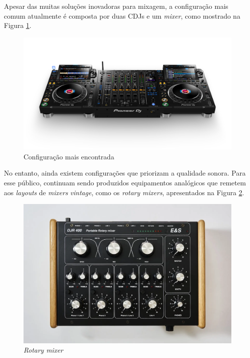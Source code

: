 Apesar das muitas soluções inovadoras para mixagem, a configuração mais comum atualmente é composta por duas CDJs e um \textit{mixer}, como mostrado na Figura \ref{fig17}.

\begin{figure}[h]
	\centering
    \includegraphics[scale=0.3]{figuras/fig17.png}
	\caption{Configuração mais encontrada \cite{pioneerdjDJMA94channel}}
	\label{fig17}
\end{figure}

No entanto, ainda existem configurações que priorizam a qualidade sonora. Para esse público, continuam sendo produzidos equipamentos analógicos que remetem aos \textit{layouts} de \textit{mixers} \textit{vintage}, como os \textit{rotary mixers}, apresentados na Figura \ref{fig18}.

\begin{figure}[h]
	\centering
    \includegraphics[scale=0.2]{figuras/fig18.png}
	\caption{\textit{Rotary mixer} \cite{electroniquespectacleampAUDIO}}
	\label{fig18}
\end{figure}

